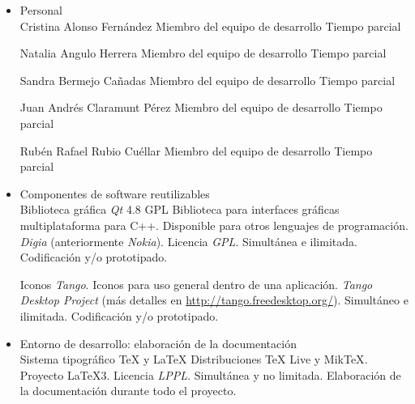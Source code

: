 

\begin{itemize}
	\item Personal \\

		{Cristina Alonso Fernández}	%
		{Miembro del equipo de desarrollo}	%
		{}	%
		{Tiempo parcial}	%
		{}	%

		{Natalia Angulo Herrera}
		{Miembro del equipo de desarrollo}
		{}
		{Tiempo parcial}
		{}

		{Sandra Bermejo Cañadas}
		{Miembro del equipo de desarrollo}
		{}
		{Tiempo parcial}
		{}

		{Juan Andrés Claramunt Pérez}
		{Miembro del equipo de desarrollo}
		{}
		{Tiempo parcial}
		{}

		{Rubén Rafael Rubio Cuéllar}
		{Miembro del equipo de desarrollo}
		{}
		{Tiempo parcial}
		{}

	\item Componentes de software reutilizables \\

		{Biblioteca gráfica \textit{Qt} 4.8 GPL}
		{Biblioteca para interfaces gráficas multiplataforma para C++. Disponible para otros lenguajes de programación.}
		{\textit{Digia} (anteriormente \textit{Nokia}). Licencia \textit{GPL}.}
		{Simultánea e ilimitada.}
		{Codificación y/o prototipado.}


		{Iconos \textit{Tango}.}
		{Iconos para uso general dentro de una aplicación.}
		{\textit{Tango Desktop Project} (más detalles en \url{http://tango.freedesktop.org/}).}
		{Simultáneo e ilimitada.}
		{Codificación y/o prototipado.}

	\item Entorno de desarrollo: elaboración  de la documentación \\

		{Sistema tipográfico {\rmfamily \TeX{}} y {\rmfamily\LaTeX{}}}
		{Distribuciones {\rmfamily\TeX{} Live} y {\rmfamily Mik\TeX{}}.}
		{Proyecto {\rmfamily\LaTeX{}3}. Licencia \textit{LPPL}.}
		{Simultánea y no limitada.}
		{Elaboración de la documentación durante todo el proyecto.}


\end{itemize}
